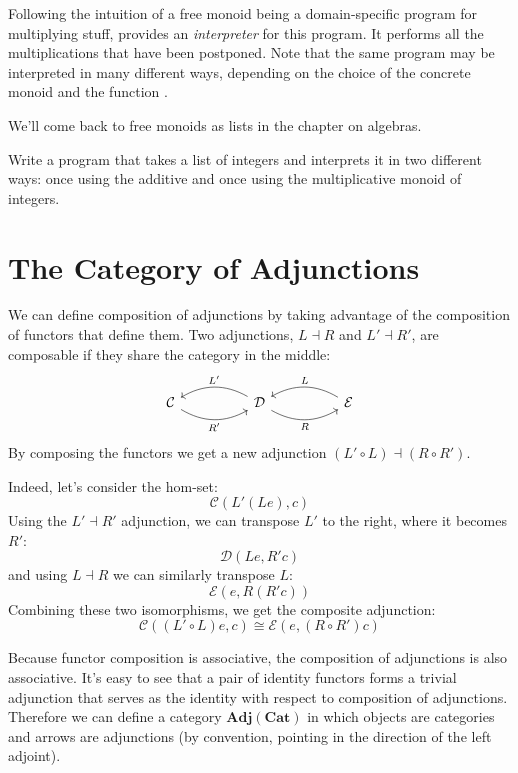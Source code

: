 \documentclass[DaoFP]{subfiles}
\begin{document}
Following the intuition of a free monoid being a domain-specific program for multiplying stuff,  provides an \emph{interpreter} for this program. It performs all the multiplications that have been postponed. Note that the same program may be interpreted in many different ways, depending on the choice of the concrete monoid and the function .

We'll come back to free monoids as lists in the chapter on algebras.

\begin{exercise}
Write a program that takes a list of integers and interprets it in two different ways: once using the additive and once using the multiplicative monoid of integers.
\end{exercise}

\section{The Category of Adjunctions}
We can define composition of adjunctions by taking advantage of the composition of functors that define them. Two adjunctions, $L \dashv R$ and $L' \dashv R'$, are composable if they share the category in the middle:
\[
 \begin{tikzcd}
  \mathcal{C}
  \arrow[rr, bend right, "R'"']
  &&
  \mathcal{D}
  \arrow[ll, bend right, "L'"']
    \arrow[rr, bend right, "R"']
&&
  \mathcal{E}
  \arrow[ll, bend right, "L"']
 \end{tikzcd}
\]
By composing the functors we get a new adjunction $(L' \circ L) \dashv (R \circ R')$. 

Indeed, let's consider the hom-set:
\[ \mathcal{C}(L' (L e), c) \]
Using the $L' \dashv R'$ adjunction, we can transpose $L'$ to the right, where it becomes $R'$:
\[ \mathcal{D}(L e, R' c) \]
and using $L \dashv R$ we can similarly transpose $L$:
\[ \mathcal{E}( e, R(R' c)) \]
Combining these two isomorphisms, we get the composite adjunction:
\[ \mathcal{C}((L' \circ L) e, c) \cong \mathcal{E}( e, (R \circ R') c)\]

Because functor composition is associative, the composition of adjunctions is also associative. It's easy to see that a pair of identity functors forms a trivial adjunction that serves as the identity with respect to composition of adjunctions. Therefore we can define a category $\mathbf{Adj}(\mathbf{Cat})$ in which objects are categories and arrows are adjunctions (by convention, pointing in the direction of the left adjoint). 
\end{document}
